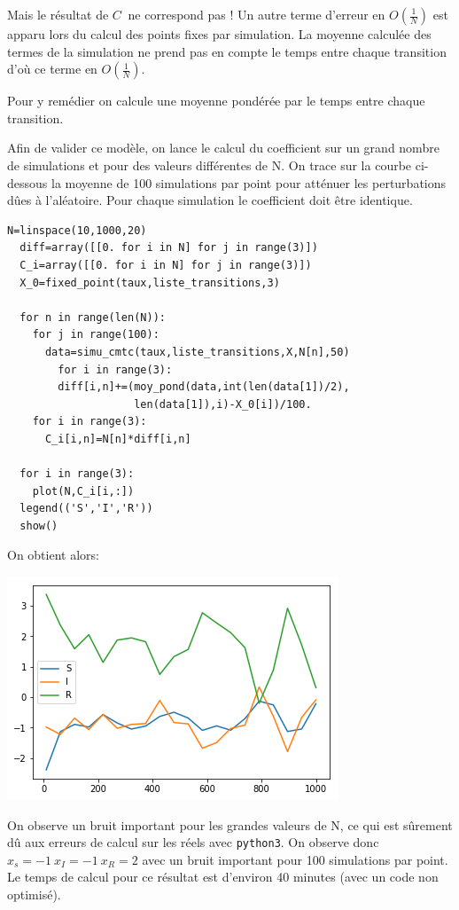 \documentclass[a4paper,12pt]{report}
\def\D{\displaystyle}
\begin{document}
Mais le résultat de $\D C \ $ ne correspond pas ! Un autre terme d'erreur en
$\D O(\frac{1}{N})$ est apparu lors du calcul des points fixes par
simulation. La moyenne calculée des termes de la simulation ne prend
pas en compte le temps entre chaque transition d'où ce terme en
$\D O(\frac{1}{N})$.

Pour y remédier on calcule une moyenne pondérée par le temps entre
chaque transition.

Afin de valider ce modèle, on lance le calcul du coefficient sur un
grand nombre de simulations et pour des valeurs différentes de N. On
trace sur la courbe ci-dessous la moyenne de 100 simulations par point
pour atténuer les perturbations dûes à l'aléatoire. Pour
chaque simulation le coefficient doit être identique.

\begin{lstlisting}[frame=single]
  N=linspace(10,1000,20)
  diff=array([[0. for i in N] for j in range(3)])
  C_i=array([[0. for i in N] for j in range(3)])
  X_0=fixed_point(taux,liste_transitions,3)

  for n in range(len(N)):
    for j in range(100):
      data=simu_cmtc(taux,liste_transitions,X,N[n],50)
        for i in range(3):
        diff[i,n]+=(moy_pond(data,int(len(data[1])/2),
                    len(data[1]),i)-X_0[i])/100.
    for i in range(3):
      C_i[i,n]=N[n]*diff[i,n]

  for i in range(3):
    plot(N,C_i[i,:])
  legend(('S','I','R'))
  show()
\end{lstlisting}

On obtient alors:
\begin{center}
  \includegraphics{figure3.png}
\end{center}

On observe un bruit important pour les grandes valeurs de N, ce qui est
sûrement dû aux erreurs de calcul sur les réels avec \texttt{python3}. On
observe donc $\D x_s=-1 \ x_I=-1\ x_R=2$ avec un bruit important pour 100
simulations par point. Le temps de calcul pour ce résultat est
d'environ 40 minutes (avec un code non optimisé).
\end{document}
